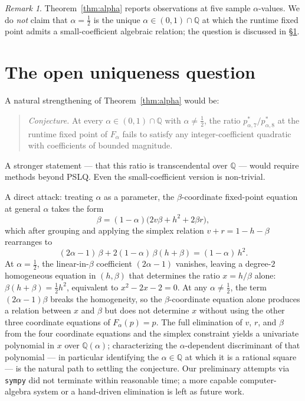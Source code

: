 \documentclass[11pt,reqno]{amsart}
\theoremstyle{plain}
\theoremstyle{definition}
\theoremstyle{remark}
\newtheorem*{remark}{Remark}
\newcommand{\Q}{\mathbb{Q}}
\newcommand{\Fmix}{F_{\alpha}}
\begin{document}
\begin{remark}
Theorem~\ref{thm:alpha} reports observations at five sample
$\alpha$-values. We do \emph{not} claim that $\alpha=\tfrac12$ is
the unique $\alpha\in(0,1)\cap\Q$ at which the runtime fixed point
admits a small-coefficient algebraic relation; the question is
discussed in \S\ref{sec:scope-alpha}.
\end{remark}

\section{The open uniqueness question}\label{sec:scope-alpha}

A natural strengthening of Theorem~\ref{thm:alpha} would be:

\begin{quote}
\emph{Conjecture.} At every $\alpha\in(0,1)\cap\Q$ with
$\alpha\neq\tfrac12$, the ratio
$p^{*}_{\alpha,7}/p^{*}_{\alpha,8}$ at the runtime fixed point of
$\Fmix$ fails to satisfy any integer-coefficient quadratic with
coefficients of bounded magnitude.
\end{quote}

A stronger statement — that this ratio is transcendental over
$\Q$ — would require methods beyond PSLQ. Even the
small-coefficient version is non-trivial.

A direct attack: treating $\alpha$ as a parameter, the
$\beta$-coordinate fixed-point equation at general $\alpha$ takes
the form
\[
\beta=(1-\alpha)\bigl(2v\beta+h^{2}+2\beta r\bigr),
\]
which after grouping and applying the simplex relation
$v+r=1-h-\beta$ rearranges to
\[
(2\alpha-1)\,\beta+2(1-\alpha)\,\beta(h+\beta)=(1-\alpha)\,h^{2}.
\]
At $\alpha=\tfrac12$, the linear-in-$\beta$ coefficient $(2\alpha-1)$
vanishes, leaving a degree-$2$ homogeneous equation in $(h,\beta)$
that determines the ratio $x=h/\beta$ alone:
$\beta(h+\beta)=\tfrac12 h^{2}$, equivalent to $x^{2}-2x-2=0$. At
any $\alpha\neq\tfrac12$, the term $(2\alpha-1)\beta$ breaks the
homogeneity, so the $\beta$-coordinate equation alone produces a
relation between $x$ and $\beta$ but does not determine $x$
without using the other three coordinate equations of $F_{\alpha}(p)=p$.
The full elimination of $v$, $r$, and $\beta$ from the four
coordinate equations and the simplex constraint yields a univariate
polynomial in $x$ over $\Q(\alpha)$; characterizing the
$\alpha$-dependent discriminant of that polynomial — in particular
identifying the $\alpha\in\Q$ at which it is a rational square —
is the natural path to settling the conjecture. Our preliminary
attempts via \texttt{sympy} did not terminate within reasonable
time; a more capable computer-algebra system or a hand-driven
elimination is left as future work.
\end{document}
